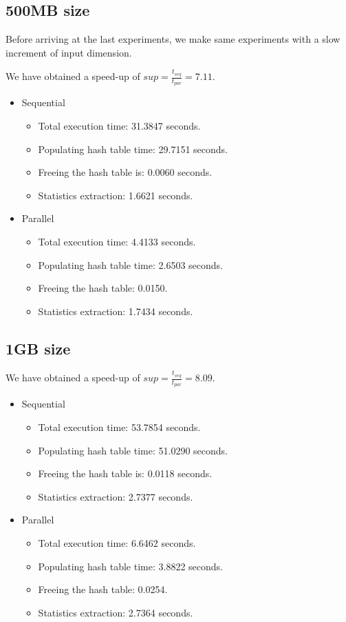 \subsection{500MB size}
Before arriving at the last experiments, we make same experiments with a slow increment of input dimension.

We have obtained a speed-up of $sup=\tfrac{t_{seq}}{t_{par}}=7.11$.
\begin{itemize}
    \item Sequential
    \begin{itemize}
        \item Total execution time: 31.3847 seconds.
        \item Populating hash table time: 29.7151 seconds.
        \item Freeing the hash table is: 0.0060 seconds.
        \item Statistics extraction: 1.6621 seconds.
    \end{itemize}
    \item Parallel
    \begin{itemize}
        \item Total execution time: 4.4133 seconds.
        \item Populating hash table time: 2.6503 seconds.
        \item Freeing the hash table: 0.0150.
        \item Statistics extraction: 1.7434 seconds.
    \end{itemize}
\end{itemize}

\subsection{1GB size}
We have obtained a speed-up of $sup=\tfrac{t_{seq}}{t_{par}}=8.09$.
\begin{itemize}
    \item Sequential
    \begin{itemize}
        \item Total execution time: 53.7854 seconds.
        \item Populating hash table time: 51.0290 seconds.
        \item Freeing the hash table is: 0.0118 seconds.
        \item Statistics extraction: 2.7377 seconds.
    \end{itemize}
    \item Parallel
    \begin{itemize}
        \item Total execution time: 6.6462 seconds.
        \item Populating hash table time: 3.8822 seconds.
        \item Freeing the hash table: 0.0254.
        \item Statistics extraction: 2.7364 seconds.
    \end{itemize}
\end{itemize}

